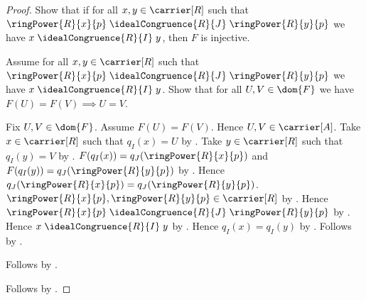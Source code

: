 \begin{proof}
    Show that if for all $x,y\in\carrier[R]$ such that
            $\ringPower{R}{x}{p}
                \mathrel{\idealCongruence{R}{J}}
            \ringPower{R}{y}{p}$ we have
                $x\mathrel{\idealCongruence{R}{I}}y$,
        then $F$ is injective.
    \begin{subproof}
        Assume for all $x,y\in\carrier[R]$ such that
                $\ringPower{R}{x}{p}
                    \mathrel{\idealCongruence{R}{J}}
                \ringPower{R}{y}{p}$ we have
                    $x\mathrel{\idealCongruence{R}{I}}y$.
        Show that for all $U,V\in\dom{F}$ we have
            $F(U)=F(V)\implies U=V$.
        \begin{subproof}
            Fix $U,V\in\dom{F}$.
            Assume $F(U)=F(V)$.
            Hence $U,V\in\carrier[A]$.
            Take $x\in\carrier[R]$ such that $q_I(x)=U$ by
                .
            Take $y\in\carrier[R]$ such that $q_I(y)=V$ by
                .
            $F(q_I(x))=q_J(\ringPower{R}{x}{p})$ and
                $F(q_I(y))=q_J(\ringPower{R}{y}{p})$ by
                .
            Hence
                $q_J(\ringPower{R}{x}{p})
                    =q_J(\ringPower{R}{y}{p})$.
            $\ringPower{R}{x}{p},\ringPower{R}{y}{p}\in\carrier[R]$ by
                .
            Hence
                $\ringPower{R}{x}{p}
                    \mathrel{\idealCongruence{R}{J}}
                \ringPower{R}{y}{p}$ by
                .
            Hence $x\mathrel{\idealCongruence{R}{I}}y$ by
                \auto.
            Hence $q_I(x)=q_I(y)$ by
                .
            Follows by \auto.
        \end{subproof}
        Follows by .
    \end{subproof}
    Follows by \auto.
\end{proof}

